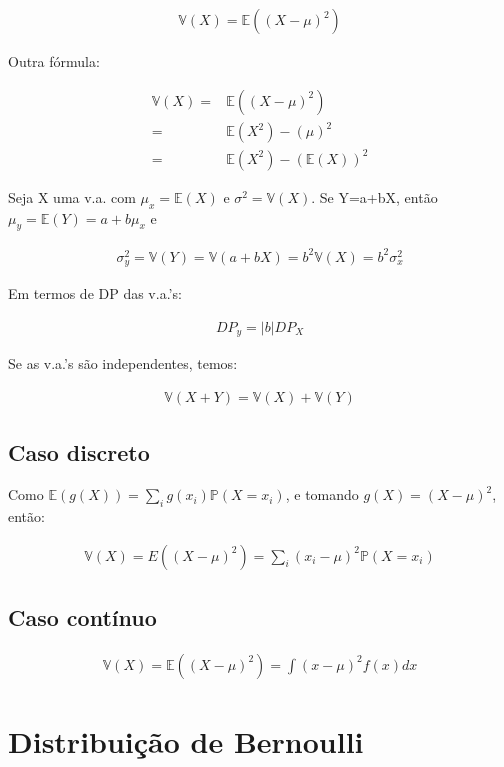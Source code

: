 \documentclass[11pt,a4paper]{article}
\begin{document}
		\begin{eqnarray*}
			\mathbb{V}(X)=\mathbb{E}((X-\mu)^2)
		\end{eqnarray*}

		Outra fórmula:
		
		\begin{eqnarray*}
			\mathbb{V}(X)=&\mathbb{E}((X-\mu)^2)\\
			=&\mathbb{E}(X^2)-(\mu)^2\\
			=&\mathbb{E}(X^2)-(\mathbb{E}(X))^2
		\end{eqnarray*}
		
		Seja X uma v.a. com $\mu_x=\mathbb{E}(X)$ e $\sigma^2=\mathbb{V}(X)$.
		Se Y=a+bX, então $\mu_y=\mathbb{E}(Y)=a+b\mu_x$ e
		
		\begin{eqnarray*}
			\sigma_y^2=\mathbb{V}(Y)=\mathbb{V}(a+bX)=b^2\mathbb{V}(X)=b^2\sigma_x^2
		\end{eqnarray*}
		
		Em termos de DP das v.a.'s:
		
		\begin{eqnarray*}
			DP_y=|b|DP_X
		\end{eqnarray*}
		
		Se as v.a.'s são independentes, temos:
		
		\begin{eqnarray*}
			\mathbb{V}(X+Y)=\mathbb{V}(X)+\mathbb{V}(Y)
		\end{eqnarray*}
		
		\subsection{Caso discreto}
		
		Como $\mathbb{E}(g(X))=\sum_ig(x_i)\mathbb{P}(X=x_i)$, e tomando $g(X)=(X-\mu)^2$, então:
		
		\begin{eqnarray*}
			\mathbb{V}(X)=E((X-\mu)^2)=\sum_i(x_i-\mu)^2\mathbb{P}(X=x_i)
		\end{eqnarray*}
		
		\subsection{Caso contínuo}
		\begin{eqnarray*}
			\mathbb{V}(X)=\mathbb{E}((X-\mu)^2)=\int(x-\mu)^2f(x)dx
		\end{eqnarray*}
		
		\section{Distribuição de Bernoulli}
		
\end{document}

